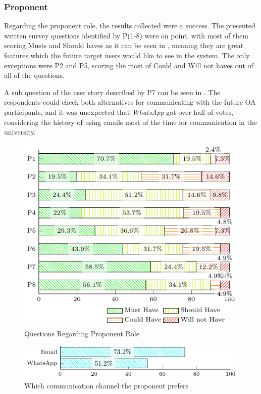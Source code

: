 \subsubsection{Proponent}\label{sec:survey-quant-proponent}

Regarding the proponent role, the results collected were a success. The presented written survey questions identified by P(1-8) were on point, with most of them scoring Musts and Should haves as it can be seen in , meaning they are great features which the future target users would like to see in the system. The only exceptions were P2 and P5, scoring the most of Could and Will not haves out of all of the questions.

A sub question of the user story described by P7 can be seen in . The respondents could check both alternatives for communicating with the future \ac{OA} participants, and it was unexpected that \textit{WhatsApp} got over half of votes, considering the history of using emails most of the time for communication in the university.

\begin{figure}[!htb]
  \caption{Questions Regarding Proponent Role}\label{fig:proponent-questions}
  \begin{center}
    \includegraphics[width=13cm]{img/5-questions-proponent.pdf}
  \end{center}
\end{figure}

\begin{figure}[!htb]
  \caption{Which communication channel the proponent prefers}\label{fig:p7-question}
  \begin{center}
    \includegraphics[width=13cm]{img/5-questions-proponent-P7-1.pdf}
  \end{center}
\end{figure}

